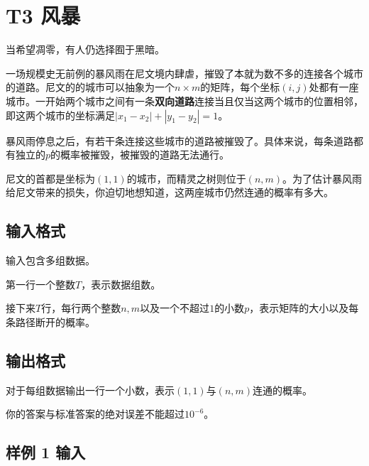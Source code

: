 \documentclass[12pt]{article}
\date{}
\begin{document}
\pagestyle{main}

\setcounter{section}{2}

\section{T3 风暴}

当希望凋零，有人仍选择囿于黑暗。\par

一场规模史无前例的暴风雨在尼文境内肆虐，摧毁了本就为数不多的连接各个城市的道路。尼文的的城市可以抽象为一个$n\times m$的矩阵，每个坐标$(i, j)$处都有一座城市。一开始两个城市之间有一条\textbf{双向道路}连接当且仅当这两个城市的位置相邻，即这两个城市的坐标满足$|x_1 - x_2| + |y_1 - y_2| = 1$。\par
暴风雨停息之后，有若干条连接这些城市的道路被摧毁了。具体来说，每条道路都有独立的$p$的概率被摧毁，被摧毁的道路无法通行。\par
尼文的首都是坐标为$(1, 1)$的城市，而精灵之树则位于$(n, m)$。为了估计暴风雨给尼文带来的损失，你迫切地想知道，这两座城市仍然连通的概率有多大。\par

\subsection{输入格式}

输入包含多组数据。\par
第一行一个整数$T$，表示数据组数。\par
接下来$T$行，每行两个整数$n, m$以及一个不超过$1$的小数$p$，表示矩阵的大小以及每条路径断开的概率。

\subsection{输出格式}

对于每组数据输出一行一个小数，表示$(1, 1)$与$(n, m)$连通的概率。\par
你的答案与标准答案的绝对误差不能超过$10^{-6}$。

\subsection{样例 1 输入}
\end{document}
